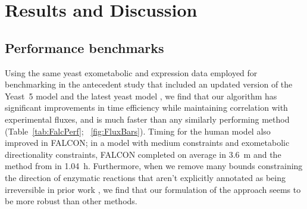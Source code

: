 




\section{Results and Discussion}

\subsection{Performance benchmarks}
Using the same yeast exometabolic and expression data employed for
benchmarking in the antecedent study \citep{Lee2012} that included an
updated version of the Yeast~5 model \citep{Heavner2012} and the latest
yeast model \citep{Aung2013}, we find that
our algorithm has significant improvements in time efficiency while
maintaining correlation with experimental fluxes, and is much faster 
than any similarly performing method (Table~\ref{tab:FalcPerf}; 
\suppOrApp \Fig~\ref{fig:FluxBars}).
Timing for the human model also improved in FALCON; in a model with
medium constraints and exometabolic directionality constraints, FALCON
completed on average in 3.6~m and the method from \citealt{Lee2012} in
1.04~h. Furthermore, when we remove many bounds constraining the
direction of enzymatic reactions that aren't explicitly annotated as
being irreversible in prior work \citep{Lee2012}, we find that our
formulation of the approach seems to be more robust than other
methods.



